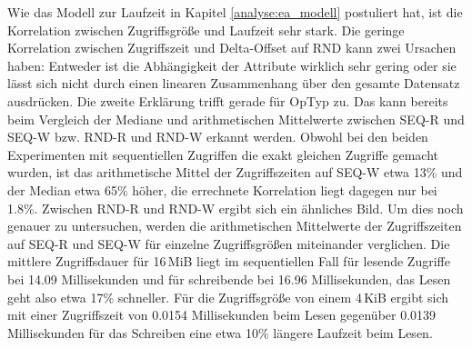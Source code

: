 \documentclass[
	twoside,
	12pt,
	a4paper,
	BCOR10mm,
	DIV14,
	listof=totoc,
	bibliography=totoc,
	headsepline
]{scrreprt}
\begin{document}
Wie das Modell zur Laufzeit in Kapitel \ref{analyse:ea_modell} postuliert hat, ist die Korrelation zwischen Zugriffsgröße und Laufzeit sehr stark.
Die geringe Korrelation zwischen Zugriffszeit und Delta-Offset auf RND kann zwei Ursachen haben: Entweder ist die Abhängigkeit der Attribute wirklich sehr gering oder sie lässt sich nicht durch einen linearen Zusammenhang über den gesamte Datensatz ausdrücken. 
Die zweite Erklärung trifft gerade für OpTyp zu. 
Das kann bereits beim Vergleich der Mediane und arithmetischen Mittelwerte zwischen SEQ-R und SEQ-W bzw. RND-R und RND-W erkannt werden.
Obwohl bei den beiden Experimenten mit sequentiellen Zugriffen die exakt gleichen Zugriffe gemacht wurden, ist das arithmetische Mittel der Zugriffszeiten auf SEQ-W etwa 13\% und der Median etwa 65\% höher, die errechnete Korrelation liegt dagegen nur bei 1.8\%. Zwischen RND-R und RND-W ergibt sich ein ähnliches Bild.
Um dies noch genauer zu untersuchen, werden die arithmetischen Mittelwerte der Zugriffszeiten auf SEQ-R und SEQ-W für einzelne Zugriffsgrößen miteinander verglichen.
Die mittlere Zugriffsdauer für 16\,MiB liegt im sequentiellen Fall für lesende Zugriffe bei 14.09 Millisekunden und für schreibende bei 16.96 Millisekunden, das Lesen geht also etwa 17\% schneller.
Für die Zugriffsgröße von einem 4\,KiB ergibt sich mit einer Zugriffszeit von 0.0154 Millisekunden beim Lesen gegenüber 0.0139 Millisekunden für das Schreiben eine etwa 10\% längere Laufzeit beim Lesen.

\begin{table}
	\centering
	\scriptsize
\end{table}
\end{document}
